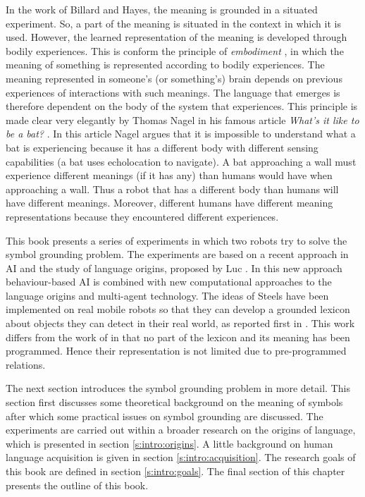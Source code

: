 In the work of Billard and Hayes, the meaning is grounded in a situated experiment. So, a part of the meaning is situated in the context in which it is used. However, the learned representation of the meaning is developed through bodily experiences. This is conform the principle of {\em embodiment} \citep{lakoff:1987}, in which the meaning of something is represented according to bodily experiences. The meaning represented in someone's (or something's) brain depends on previous experiences of interactions with such meanings. The language that emerges is therefore dependent on the body of the system that experiences. This principle is made clear very elegantly by Thomas Nagel in his famous article {\em What's it like to be a bat?} \citep{nagel:1974}. In this article Nagel argues that it is impossible to understand what a bat is experiencing because it has a different body with different sensing capabilities (a bat uses echolocation to navigate). A bat approaching a wall must experience different meanings (if it has any) than humans would have when approaching a wall. Thus a robot that has a different body than humans will have different meanings. Moreover, different humans have different meaning representations because they encountered different experiences.

This book presents a series of experiments in which two robots try to solve the symbol grounding problem. The experiments are based on a recent approach in AI and the study of language origins, proposed by Luc \citet{steels:1996a}. In this new approach behaviour-based AI \citep{steelsbrooks:1993} is combined with new computational approaches to the language origins and multi-agent technology. The ideas of Steels have been implemented on real mobile robots so that they can develop a grounded lexicon about objects they can detect in their real world, as reported first in \citep{steelsvogt:1997}. This work differs from the work of \citep{yancostein,billard:1997a} in that no part of the lexicon and its meaning has been programmed. Hence their representation is not limited due to pre-programmed relations.

The next section introduces the symbol grounding problem in more detail. This section first discusses some theoretical background on the meaning of symbols after which some practical issues on symbol grounding are discussed. The experiments are carried out within a broader research on the origins of language, which is presented in section \ref{s:intro:origins}. A little background on human language acquisition is given in section \ref{s:intro:acquisition}. The research goals of this book are defined in section \ref{s:intro:goals}. The final section of this chapter presents the outline of this book.

